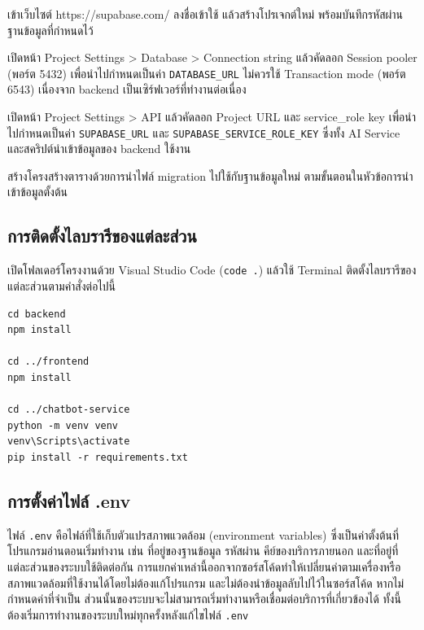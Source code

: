 \begin{numlist}
\item เข้าเว็บไซต์ https://supabase.com/ ลงชื่อเข้าใช้ แล้วสร้างโปรเจกต์ใหม่ พร้อมบันทึกรหัสผ่านฐานข้อมูลที่กำหนดไว้
\item เปิดหน้า Project Settings > Database > Connection string แล้วคัดลอก Session pooler (พอร์ต 5432) เพื่อนำไปกำหนดเป็นค่า \texttt{DATABASE\_URL} ไม่ควรใช้ Transaction mode (พอร์ต 6543) เนื่องจาก backend เป็นเซิร์ฟเวอร์ที่ทำงานต่อเนื่อง
\item เปิดหน้า Project Settings > API แล้วคัดลอก Project URL และ service\_role key เพื่อนำไปกำหนดเป็นค่า \texttt{SUPABASE\_URL} และ \texttt{SUPABASE\_SERVICE\_ROLE\_KEY} ซึ่งทั้ง AI Service และสคริปต์นำเข้าข้อมูลของ backend ใช้งาน
\item สร้างโครงสร้างตารางด้วยการนำไฟล์ migration ไปใช้กับฐานข้อมูลใหม่ ตามขั้นตอนในหัวข้อการนำเข้าข้อมูลตั้งต้น
\end{numlist}

\subsection{การติดตั้งไลบรารีของแต่ละส่วน}

เปิดโฟลเดอร์โครงงานด้วย Visual Studio Code (\texttt{code .}) แล้วใช้ Terminal ติดตั้งไลบรารีของแต่ละส่วนตามคำสั่งต่อไปนี้

\begin{codeblock}
\begin{lstlisting}[numbers=none]
cd backend
npm install

cd ../frontend
npm install

cd ../chatbot-service
python -m venv venv
venv\Scripts\activate
pip install -r requirements.txt
\end{lstlisting}
\end{codeblock}

\subsection{การตั้งค่าไฟล์ .env}

ไฟล์ \texttt{.env} คือไฟล์ที่ใช้เก็บตัวแปรสภาพแวดล้อม (environment variables) ซึ่งเป็นค่าตั้งต้นที่โปรแกรมอ่านตอนเริ่มทำงาน เช่น ที่อยู่ของฐานข้อมูล รหัสผ่าน คีย์ของบริการภายนอก และที่อยู่ที่แต่ละส่วนของระบบใช้ติดต่อกัน การแยกค่าเหล่านี้ออกจากซอร์สโค้ดทำให้เปลี่ยนค่าตามเครื่องหรือสภาพแวดล้อมที่ใช้งานได้โดยไม่ต้องแก้โปรแกรม และไม่ต้องนำข้อมูลลับไปไว้ในซอร์สโค้ด หากไม่กำหนดค่าที่จำเป็น ส่วนนั้นของระบบจะไม่สามารถเริ่มทำงานหรือเชื่อมต่อบริการที่เกี่ยวข้องได้ ทั้งนี้ ต้องเริ่มการทำงานของระบบใหม่ทุกครั้งหลังแก้ไขไฟล์ \texttt{.env}

